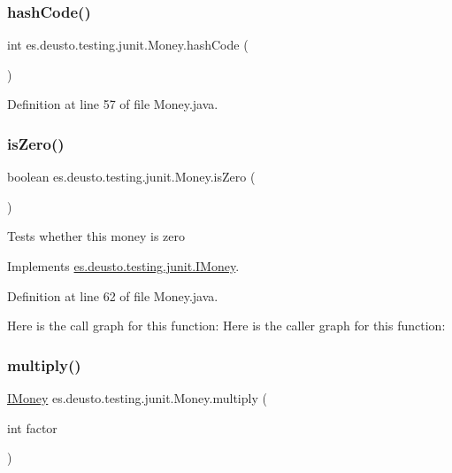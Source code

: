 \subsubsection{\texorpdfstring{hash\+Code()}{hashCode()}}
{\footnotesize\ttfamily int es.\+deusto.\+testing.\+junit.\+Money.\+hash\+Code (\begin{DoxyParamCaption}{ }\end{DoxyParamCaption})}



Definition at line 57 of file Money.\+java.

\mbox{\label{classes_1_1deusto_1_1testing_1_1junit_1_1_money_a797658a03260b535e9a36ebbcc3b19c9}} 
\subsubsection{\texorpdfstring{is\+Zero()}{isZero()}}
{\footnotesize\ttfamily boolean es.\+deusto.\+testing.\+junit.\+Money.\+is\+Zero (\begin{DoxyParamCaption}{ }\end{DoxyParamCaption})}

Tests whether this money is zero 

Implements \mbox{\hyperlink{interfacees_1_1deusto_1_1testing_1_1junit_1_1_i_money_a166c39b6f931e49769580a04f8c73500}{es.\+deusto.\+testing.\+junit.\+I\+Money}}.



Definition at line 62 of file Money.\+java.

Here is the call graph for this function\+:
Here is the caller graph for this function\+:
\mbox{\label{classes_1_1deusto_1_1testing_1_1junit_1_1_money_a02c7d4e9013710f70d1d46e9c9ebae88}} 
\subsubsection{\texorpdfstring{multiply()}{multiply()}}
{\footnotesize\ttfamily \mbox{\hyperlink{interfacees_1_1deusto_1_1testing_1_1junit_1_1_i_money}{I\+Money}} es.\+deusto.\+testing.\+junit.\+Money.\+multiply (\begin{DoxyParamCaption}\item[{int}]{factor }\end{DoxyParamCaption})}

